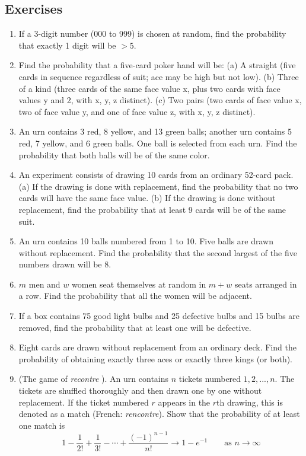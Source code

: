 \documentclass[../main.tex]{subfiles}
\begin{document}
\subsection{Exercises} %
\begin{enumerate}
	\item If a 3-digit number (000 to 999) is chosen at random, find the probability that
	exactly 1 digit will be $>5$.
	\item  Find the probability that a five-card poker hand will be:
	(a) A straight (five cards in sequence regardless of suit; ace may be high but
	not low).
	(b) Three of a kind (three cards of the same face value x, plus two cards with
	face values y and 2, with x, y, z distinct).
	(c) Two pairs (two cards of face value x, two of face value y, and one of face
	value z, with x, y, z distinct).
	\item  An urn contains 3 red, 8 yellow, and 13 green balls; another urn contains 5
	red, 7 yellow, and 6 green balls. One ball is selected from each urn. Find the
	probability that both balls will be of the same color.
	\item  An experiment consists of drawing 10 cards from an ordinary 52-card pack.
	(a) If the drawing is done with replacement, find the probability that no two
	cards will have the same face value.
	(b) If the drawing is done without replacement, find the probability that at
	least 9 cards will be of the same suit.
	\item  An urn contains 10 balls numbered from 1 to 10. Five balls are drawn without
	replacement. Find the probability that the second largest of the five numbers
	drawn will be 8.
	\item  $m$ men and $w$ women seat themselves at random in $m + w$ seats arranged in a
	row. Find the probability that all the women will be adjacent.
	\item  If a box contains 75 good light bulbs and 25 defective bulbs and 15 bulbs are
	removed, find the probability that at least one will be defective.
	\item  Eight cards are drawn without replacement from an ordinary deck. Find the
	probability of obtaining exactly three aces or exactly three kings (or both).
	\item (The game of \textit{recontre} ). An urn contains $n$ tickets numbered $1,2,...,n$.
	The tickets are shuffled thoroughly and then drawn one by one without replacement.
	If the ticket numbered $r$ appears in the $r$th drawing, this is denoted
	as a match (French: \textit{rencontre}). Show that the probability of at least one match
	is
	$$ 1 - \frac{1}{2!} + \frac{1}{3!} - \cdots + \frac{(-1)^{n-1}}{n!}
	\rightarrow 1 - e^{-1} \qquad \mbox{as } n \rightarrow \infty$$
	

\end{enumerate}
\end{document}
